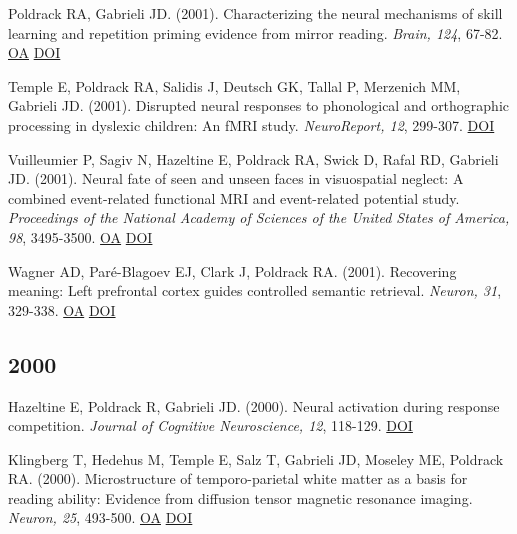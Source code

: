\documentclass[10pt, letterpaper]{article}
\begin{document}
Poldrack RA, Gabrieli JD.  (2001). Characterizing the neural mechanisms of skill learning and repetition priming evidence from mirror reading. \textit{Brain, 124}, 67-82. \href{https://doi.org/10.1093/brain/124.1.67}{OA} \href{https://doi.org/10.1093/brain/124.1.67}{DOI} \vspace{2mm}

Temple E, Poldrack RA, Salidis J, Deutsch GK, Tallal P, Merzenich MM, Gabrieli JD.  (2001). Disrupted neural responses to phonological and orthographic processing in dyslexic children: An fMRI study. \textit{NeuroReport, 12}, 299-307. \href{https://doi.org/10.1097/00001756-200102120-00024}{DOI} \vspace{2mm}

Vuilleumier P, Sagiv N, Hazeltine E, Poldrack RA, Swick D, Rafal RD, Gabrieli JD.  (2001). Neural fate of seen and unseen faces in visuospatial neglect: A combined event-related functional MRI and event-related potential study. \textit{Proceedings of the National Academy of Sciences of the United States of America, 98}, 3495-3500. \href{https://www.ncbi.nlm.nih.gov/pmc/articles/PMC30681}{OA} \href{https://doi.org/10.1073/pnas.051436898}{DOI} \vspace{2mm}

Wagner AD, Paré-Blagoev EJ, Clark J, Poldrack RA.  (2001). Recovering meaning: Left prefrontal cortex guides controlled semantic retrieval. \textit{Neuron, 31}, 329-338. \href{https://doi.org/10.1016/s0896-6273(01)00359-2}{OA} \href{https://doi.org/10.1016/s0896-6273(01)00359-2}{DOI} \vspace{2mm}

\subsection*{2000}Hazeltine E, Poldrack R, Gabrieli JD.  (2000). Neural activation during response competition. \textit{Journal of Cognitive Neuroscience, 12}, 118-129. \href{https://doi.org/10.1162/089892900563984}{DOI} \vspace{2mm}

Klingberg T, Hedehus M, Temple E, Salz T, Gabrieli JD, Moseley ME, Poldrack RA.  (2000). Microstructure of temporo-parietal white matter as a basis for reading ability: Evidence from diffusion tensor magnetic resonance imaging. \textit{Neuron, 25}, 493-500. \href{https://doi.org/10.1016/s0896-6273(00)80911-3}{OA} \href{https://doi.org/10.1016/s0896-6273(00)80911-3}{DOI} \vspace{2mm}
\end{document}
